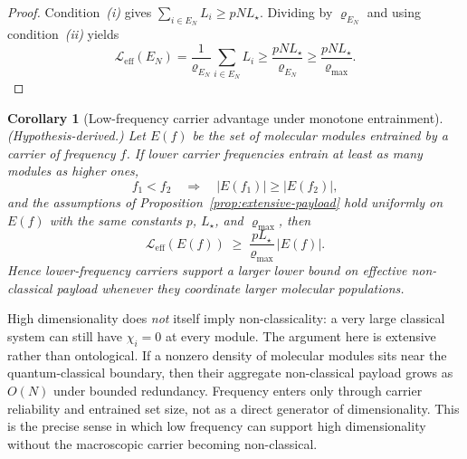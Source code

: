 \documentclass[12pt,a4paper]{article}
\newtheorem{corollary}[theorem]{Corollary}
\theoremstyle{definition}
\theoremstyle{remark}
\begin{document}
\begin{proof}
Condition~\emph{(i)} gives $\sum_{i \in E_N} L_i \geq pN L_\star$. Dividing by $\varrho_{E_N}$ and using condition~\emph{(ii)} yields
\[
\mathcal{L}_{\mathrm{eff}}(E_N) = \frac{1}{\varrho_{E_N}}\sum_{i \in E_N} L_i
\geq \frac{pN L_\star}{\varrho_{E_N}}
\geq \frac{pN L_\star}{\varrho_{\max}}.
\]
\end{proof}

\begin{corollary}[Low-frequency carrier advantage under monotone entrainment]
\label{cor:low-f-advantage}
\emph{(Hypothesis-derived.)} Let $E(f)$ be the set of molecular modules entrained by a carrier of frequency $f$. If lower carrier frequencies entrain at least as many modules as higher ones,
\[
f_1 < f_2 \quad \Longrightarrow \quad |E(f_1)| \geq |E(f_2)|,
\]
and the assumptions of Proposition~\ref{prop:extensive-payload} hold uniformly on $E(f)$ with the same constants $p$, $L_\star$, and $\varrho_{\max}$, then
\begin{equation}
\label{eq:low-f-advantage}
\mathcal{L}_{\mathrm{eff}}(E(f)) \;\geq\; \frac{pL_\star}{\varrho_{\max}}\,|E(f)|.
\end{equation}
Hence lower-frequency carriers support a larger lower bound on effective non-classical payload whenever they coordinate larger molecular populations.
\end{corollary}

High dimensionality does \emph{not} itself imply non-classicality: a very large classical system can still have $\chi_i = 0$ at every module. The argument here is extensive rather than ontological. If a nonzero density of molecular modules sits near the quantum-classical boundary, then their aggregate non-classical payload grows as $O(N)$ under bounded redundancy. Frequency enters only through carrier reliability and entrained set size, not as a direct generator of dimensionality. This is the precise sense in which low frequency can support high dimensionality without the macroscopic carrier becoming non-classical.
\end{document}
